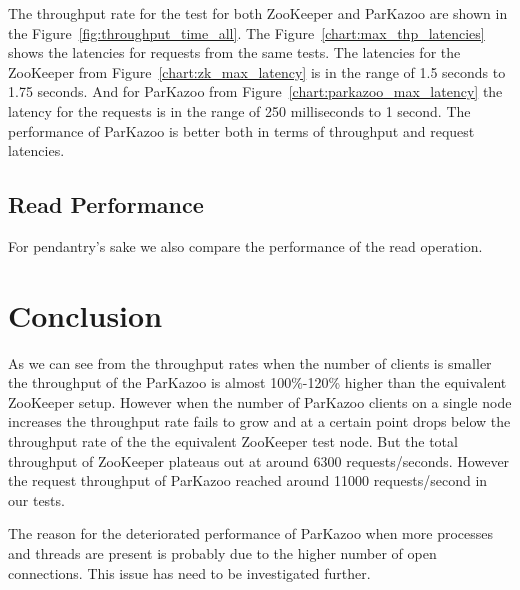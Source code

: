 

The throughput rate for the test for both ZooKeeper and ParKazoo are shown in the Figure~\ref{fig:throughput_time_all}. The Figure~\ref{chart:max_thp_latencies} shows the latencies for requests from the same tests. The latencies for the ZooKeeper from Figure~\ref{chart:zk_max_latency} is in the range of 1.5 seconds to 1.75 seconds. And for ParKazoo from Figure~\ref{chart:parkazoo_max_latency} the latency for the requests is in the range of 250 milliseconds to 1 second. The performance of ParKazoo is better both in terms of throughput and request latencies.




\subsection{Read Performance}
For pendantry's sake we also compare the performance of the read operation.




\section{Conclusion}
As we can see from the throughput rates when the number of clients is smaller the throughput of the ParKazoo is almost 100\%-120\% higher than the equivalent ZooKeeper setup. However when the number of ParKazoo clients on a single node increases the throughput rate fails to grow and at a certain point drops below the throughput rate of the the equivalent ZooKeeper test node. But the total throughput of ZooKeeper plateaus out at around 6300 requests/seconds. However the request throughput of ParKazoo reached around 11000 requests/second in our tests.

The reason for the deteriorated performance of ParKazoo when more processes and threads are present is probably due to the higher number of open connections. This issue has need to be investigated further. 
